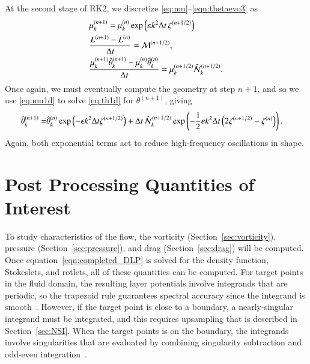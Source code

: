 \documentclass[preprint, 10pt]{elsarticle}
\begin{document}
At the second stage of RK2, we discretize \eqref{eq:mu}--\eqref{eqn:thetaevo3} as 
\begin{align}
\label{eq:mu1d}
& \mu_k^{(n+1)} = \mu_k^{(n)} \exp \left( \varepsilon k^2 {\Delta t} \, \zeta^{(n+1/2)} \right) \\
\label{eq:L1d}
& \frac{L^{(n+1)} - L^{(n)}}{\Delta t} = \mathcal{M}^{(n+1/2)}, \\
\label{eq:th1d}
& \frac{ \mu_k^{(n+1)} \hat{\theta}_k^{(n+1)} - \mu_k^{(n)} \hat{\theta}_k^{(n)}}{\Delta t} =
\mu_k^{(n+1/2)} \hat{\mathcal{N}}_k^{(n+1/2)}.
\end{align}
Once again, we must eventually compute the geometry at step $n+1$, and so we use \eqref{eq:mu1d} to solve \eqref{eq:th1d} for $\theta^{(n+1)}$, giving
\begin{align}
\hat{\theta}_k^{(n+1)} = & \hat{\theta}_k^{(n)} \exp \left( - \epsilon k^2 \Delta t \zeta^{(n+1/2)} \right) + \Delta t \, \hat{\mathcal{N}}_k^{(n+1/2)} \exp \left( - \frac{1}{2} \varepsilon k^2 \Delta t \left( 2 \zeta^{(n+1/2)} - \zeta^{(n)} \right) \right).
\end{align}
Again, both exponential terms act to reduce high-frequency oscillations in shape.

\section{Post Processing Quantities of Interest}
\label{s:qoi}
To study characteristics of the flow, the vorticity
(Section~\ref{sec:vorticity}), pressure (Section~\ref{sec:pressure}),
and drag (Section~\ref{sec:drag}) will be computed.  Once
equation~\eqref{eqn:completed_DLP} is solved for the density function,
Stokeslets, and rotlets, all of these quantities can be computed.  For
target points in the fluid domain, the resulting layer potentials
involve integrands that are periodic, so the trapezoid rule guarantees
spectral accuracy since the integrand is smooth~\cite{tre-wei2014}.
However, if the target point is close to a boundary, a nearly-singular
integrand must be integrated, and this requires upsampling that is
described in Section~\ref{sec:NSI}.  When the target points is on the
boundary, the integrands involve singularities that are evaluated by
combining singularity subtraction and odd-even
integration~\cite{sid-isr1988}.  



\end{document}

